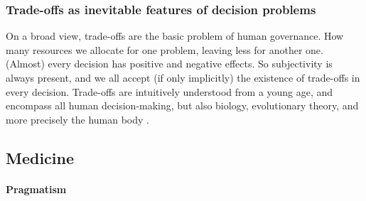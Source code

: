 \subsubsection{Trade-offs as inevitable features of decision problems}
    On a broad view, trade-offs are the basic problem of human governance.
    How many resources we allocate for one problem, leaving less for another one.
    (Almost) every decision has positive and negative effects.
    So subjectivity is always present, and we all accept (if only implicitly) the existence of trade-offs in every decision. 
    Trade-offs are intuitively understood from a young age, and encompass all human decision-making, but also biology, evolutionary theory, and more precisely the human body \cite{Launer2020}.



\subsection{Medicine}

    \paragraph{Pragmatism}


